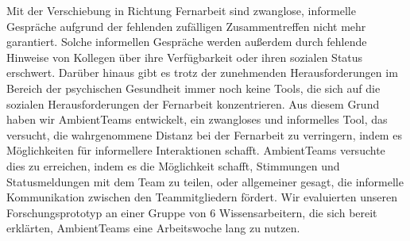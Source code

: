 \documentclass{seal_thesis}
\begin{document}
\begin{zusammenfassung}
    Mit der Verschiebung in Richtung Fernarbeit sind zwanglose, informelle Gespräche aufgrund der fehlenden zufälligen Zusammentreffen nicht mehr garantiert. Solche informellen Gespräche werden außerdem durch fehlende Hinweise von Kollegen über ihre Verfügbarkeit oder ihren sozialen Status erschwert. Darüber hinaus gibt es trotz der zunehmenden Herausforderungen im Bereich der psychischen Gesundheit immer noch keine Tools, die sich auf die sozialen Herausforderungen der Fernarbeit konzentrieren. Aus diesem Grund haben wir AmbientTeams entwickelt, ein zwangloses und informelles Tool, das versucht, die wahrgenommene Distanz bei der Fernarbeit zu verringern, indem es Möglichkeiten für informellere Interaktionen schafft. AmbientTeams versuchte dies zu erreichen, indem es die Möglichkeit schafft, Stimmungen und Statusmeldungen mit dem Team zu teilen, oder allgemeiner gesagt, die informelle Kommunikation zwischen den Teammitgliedern fördert. Wir evaluierten unseren Forschungsprototyp an einer Gruppe von 6 Wissensarbeitern, die sich bereit erklärten, AmbientTeams eine Arbeitswoche lang zu nutzen.
\end{zusammenfassung}

\tableofcontents
\listoffigures
\listoftables
\lstlistoflistings

\mainmatter









\begin{appendices}
    
\end{appendices}


\backmatter
\printbibliography
\end{document}
